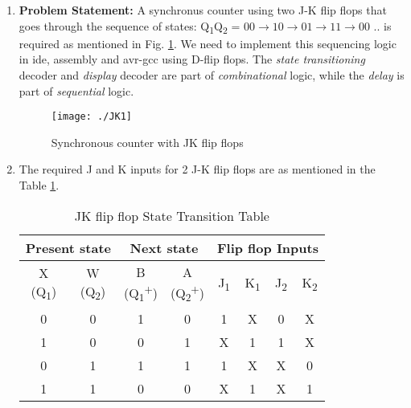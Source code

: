 \documentclass[journal,12pt,twocolumn]{IEEEtran}
\begin{document}
\begin{enumerate}[1.]
\item \textbf{Problem Statement:} A synchronus counter using two J-K flip flops that goes through the sequence of states: Q\textsubscript{1}Q\textsubscript{2} = $00 \rightarrow 10 \rightarrow 01 \rightarrow 11 \rightarrow 00$ .. is required as mentioned in Fig. \ref{fig:JKcounter}.  We need to implement this sequencing logic in ide, assembly and avr-gcc using D-flip flops. The {\em state transitioning } decoder and {\em display} decoder are part of {\em combinational} logic, while the {\em delay} is part of {\em sequential} logic.

\begin{figure}[!h]
	\begin{center}
	\texttt{[image: ./JK1]}
\end{center}
\caption{Synchronous counter with JK flip flops}
\label{fig:JKcounter}
\end{figure}
%

\item The required J and K inputs for 2 J-K flip flops are as mentioned in the Table \ref{table:JK_table}. \\

\begin{table}[h!] 
	\begin{center}
		\begin{tabular}{ |c|c|c|c|c|c|c|c| } 
			\hline
			\multicolumn{2}{|c|}{Present state} &\multicolumn{2}{|c|}{Next state} & \multicolumn{4}{|c|}{Flip flop Inputs}  \\
			\hline
			\thead{X \\ (Q\textsubscript{1})} & \thead{W \\(Q\textsubscript{2})} & \thead{B \\(Q\textsubscript{1}\textsuperscript{+})} & \thead{A \\ (Q\textsubscript{2}\textsuperscript{+})} & J\textsubscript{1} & K\textsubscript{1} & J\textsubscript{2} & K\textsubscript{2}  \\ 
			\hline
			0 & 0 & 1 & 0 & 1 & X & 0 & X  \\ 
			\hline
			1 & 0 & 0 & 1 & X & 1 & 1 & X  \\ 
			\hline
			0 & 1 & 1 & 1 & 1 & X & X & 0  \\ 
			\hline
			1 & 1 & 0 & 0 & X & 1 & X & 1  \\
			\hline
		\end{tabular}
		\caption{JK flip flop State Transition Table}
		\label{table:JK_table}
	\end{center}
\end{table}


\end{enumerate}
\end{document}
